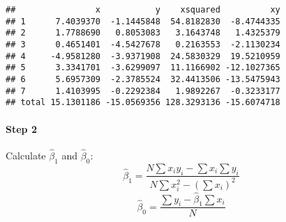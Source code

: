 \documentclass[
]{article}
\begin{document}
\begin{verbatim}
##                x           y    xsquared          xy
## 1      7.4039370  -1.1445848  54.8182830  -8.4744335
## 2      1.7788690   0.8053083   3.1643748   1.4325379
## 3      0.4651401  -4.5427678   0.2163553  -2.1130234
## 4     -4.9581280  -3.9371908  24.5830329  19.5210959
## 5      3.3341701  -3.6299097  11.1166902 -12.1027365
## 6      5.6957309  -2.3785524  32.4413506 -13.5475943
## 7      1.4103995  -0.2292384   1.9892267  -0.3233177
## total 15.1301186 -15.0569356 128.3293136 -15.6074718
\end{verbatim}

\hypertarget{step-2}{%
\paragraph{Step 2}\label{step-2}}

Calculate \(\hat\beta_1\) and \(\hat\beta_0\):
\[\hat\beta_1=\frac{N\sum x_iy_i-\sum x_i\sum y_i}{N\sum x_i^2-(\sum x_i)^2}\]
\[\hat\beta_0=\frac{\sum y_i -\hat\beta_1\sum x_i}{N}\]
\end{document}

